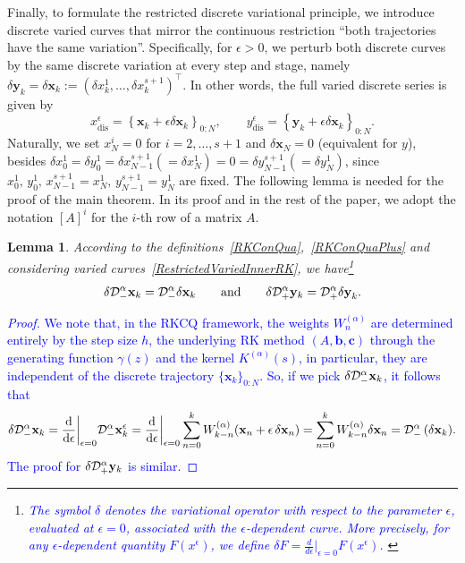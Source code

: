 \documentclass[a4paper,10pt,reqno]{amsart}
\newtheorem{lemma}{Lemma}[section]
\theoremstyle{definition}
\newcommand{\dd}{\mathrm{d}}
\newcommand{\dis}{\text{dis}}
\begin{document}
Finally, to formulate the restricted discrete variational principle, we introduce discrete varied curves that mirror the continuous restriction ``both trajectories have the same variation''. Specifically, for $\epsilon>0$, we perturb both discrete curves by the same discrete variation at every step and stage, namely $\delta \mathbf{y}_k=\delta \mathbf{x}_k:=(\delta x_k^1,\ldots,\delta x_k^{s+1})^\top$. In other words, the full varied discrete series is given by
\begin{equation}\label{RestrictedVariedInnerRK}
x_\dis^{\epsilon}=\left\{\mathbf{x}_k+\epsilon \delta \mathbf{x}_k\right\}_{0:N},\qquad y_\dis^{\epsilon}=\left\{\mathbf{y}_k+\epsilon \delta \mathbf{x}_k\right\}_{0:N}.
\end{equation}
Naturally, we  set 
$x_N^{i}=0$ for $i=2,\ldots,s+1$ and  $\delta\mathbf  x_N=0$ (equivalent for $y$), besides $\delta x_{0}^{1}=\delta y_{0}^{1}=\delta x_{N-1}^{s+1}(=\delta x_{N}^{1})=0=\delta y_{N-1}^{s+1}(=\delta y_{N}^{1})$, since $x_{0}^{1},\,y_{0}^{1},\,x_{N-1}^{s+1}=x_{N}^{1},\,y_{N-1}^{s+1}=y_{N}^{1}$  are fixed.
The following lemma is needed for the proof of the main theorem. In its proof and in the rest of the paper, we adopt the notation $[A]^i$ for the $i$-th row of a matrix $A$.
\begin{lemma}\label{VariationCommRK}
According to the definitions~\eqref{RKConQua},~\eqref{RKConQuaPlus} and considering varied curves~\eqref{RestrictedVariedInnerRK}, we have\footnote{\textcolor{blue}{The symbol $\delta$ denotes the variational  operator with respect to the  parameter 
$\epsilon$, evaluated at $\epsilon=0$, associated with the $\epsilon$-dependent curve. More precisely, for any  $\epsilon$-dependent quantity $F(x^\epsilon)$, we define $\delta F = \frac{d}{d \epsilon}\big|_{\epsilon=0}F(x^\epsilon)$.
}}
\[
\delta \mathcal{D}^{\alpha}_{-}{\bf x}_k = \mathcal{D}^{\alpha}_{-}{\bf \delta x}_k\qquad\text{and}\qquad \delta \mathcal{D}^{\alpha}_{+}{\bf y}_k = \mathcal{D}^{\alpha}_{+}{\bf \delta y}_k.
\]
\end{lemma}
\textcolor{blue}{\begin{proof}
We note that, in the RKCQ framework, the weights  $W_n^{(\alpha)}$ are determined entirely by the step size 
$h$, the underlying RK method $(A, \mathbf b, \mathbf c)$ through the generating function $\gamma(z)$ and the kernel $K^{(\alpha)}(s)$, in particular, they are independent of the discrete trajectory $\{\mathbf x_k\}_{0:N}$. So, if we pick $\delta \mathcal{D}^{\alpha}_{-}{\bf x}_k$, it follows that
\[
\delta \mathcal{D}^{\alpha}_{-}{\bf x}_k=\frac{\dd}{\dd\epsilon}\bigg|_{\epsilon=0}\mathcal{D}^{\alpha}_{-}{\bf x}_k^{\epsilon}
=\frac{\dd}{\dd\epsilon}\bigg|_{\epsilon=0} \sum_{n=0}^{k}W_{k-n}^{(\alpha)}(\mathbf x_{n}+\epsilon\,\delta \mathbf x_{n})=\sum_{n=0}^{k}W_{k-n}^{(\alpha)}\delta \mathbf x_{n}=\mathcal{D}^{\alpha}_{-}\,({\bf \delta x}_k).
\]
The proof for $\delta \mathcal{D}^{\alpha}_{+}{\bf y}_k$ is similar. 
\end{proof}}
\end{document}
